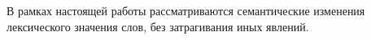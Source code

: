 \documentclass[LI,VKR]{HSEUniversity}
\begin{document}
В рамках настоящей работы рассматриваются семантические изменения
лексического значения слов, без затрагивания иных явлений.

%
\end{document}
